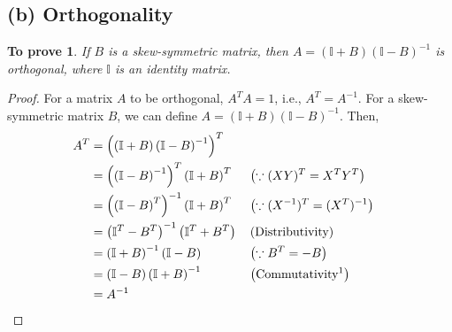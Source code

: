 \documentclass[11pt, oneside]{article}
\newtheorem*{remark}{To prove}
\begin{document}
\subsection*{(b) Orthogonality}
  \begin{remark}
    If $B$ is a skew-symmetric matrix, then $A = (\mathbb{I}+B)(\mathbb{I}-B)^{-1}$ is orthogonal, where $\mathbb{I}$ is an identity matrix.
  \end{remark}
  \begin{proof}
    For a matrix $A$ to be orthogonal, $A^T A = 1$, i.e., $A^T = A^{-1}$. For a skew-symmetric matrix $B$, we can define $ A = (\mathbb{I}+B)(\mathbb{I}-B)^{-1}$. Then,
    \begin{align*}
      A^T   &= \left(\left(\mathbb{I}+B\right)\left(\mathbb{I}-B\right)^{-1}\right)^T \\
            &= \left(\left(\mathbb{I}-B\right)^{-1}\right)^T\left(\mathbb{I}+B\right)^T     && \left(\because (XY)^T = X^T Y^T\right)\\
            &= \left(\left(\mathbb{I}-B\right)^T\right)^{-1}\left(\mathbb{I}+B\right)^T     && \left(\because (X^{-1})^T = (X^T)^{-1}\right)\\
            &= \left(\mathbb{I}^T-B^T\right)^{-1}\left(\mathbb{I}^T+B^T\right)              && \left(\text{Distributivity}\right) \\
            &= \left(\mathbb{I} + B\right)^{-1}\left(\mathbb{I}-B\right)                    && \left(\because B^T = - B\right)\\
            &= \left(\mathbb{I}-B\right)\left(\mathbb{I}+B\right)^{-1}                      && \left(\text{Commutativity\footnotemark}\right)\\
            &= A^{-1}                                                 && \qedhere
    \end{align*}
  \end{proof}
\end{document}
